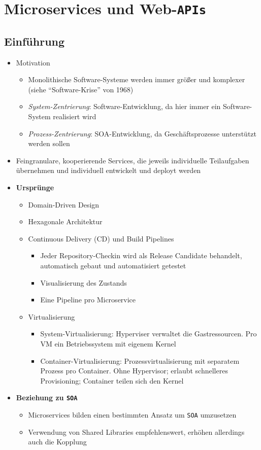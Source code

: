 \section{Microservices und Web-\texttt{APIs}}

\subsection{Einführung}
\begin{itemize}
	\item Motivation
	\begin{itemize}
		\item Monolithische Software-Systeme werden immer größer und komplexer (siehe "`Software-Krise"' von 1968)
		\item \textit{System-Zentrierung}: Software-Entwicklung, da hier immer ein Software-System realisiert wird
		\item \textit{Prozess-Zentrierung}: SOA-Entwicklung, da Geschäftsprozesse unterstützt werden sollen
	\end{itemize}
	\item Feingranulare, kooperierende Services, die jeweils individuelle Teilaufgaben übernehmen und individuell entwickelt und deployt werden
	\item \textbf{Ursprünge}
	\begin{itemize}
		\item Domain-Driven Design
		\item Hexagonale Architektur
		\item Continuous Delivery (CD) und Build Pipelines
		\begin{itemize}
			\item Jeder Repository-Checkin wird als Release Candidate behandelt, automatisch gebaut und automatisiert getestet
			\item Visualisierung des Zustands
			\item Eine Pipeline pro Microservice
		\end{itemize}
		\item Virtualisierung
		\begin{itemize}
			\item System-Virtualisierung: Hyperviser verwaltet die Gastressourcen. Pro VM ein Betriebssystem mit eigenem Kernel
			\item Container-Virtualisierung: Prozessvirtualisierung mit separatem Prozess pro Container. Ohne Hypervisor; erlaubt schnelleres Provisioning; Container teilen sich den Kernel
		\end{itemize}
	\end{itemize}
	\item \textbf{Beziehung zu \texttt{SOA}}
	\begin{itemize}
		\item Microservices bilden einen bestimmten Ansatz um \texttt{SOA} umzusetzen
		\item Verwendung von Shared Libraries empfehlenswert, erhöhen allerdings auch die Kopplung
	\end{itemize}
\end{itemize}



